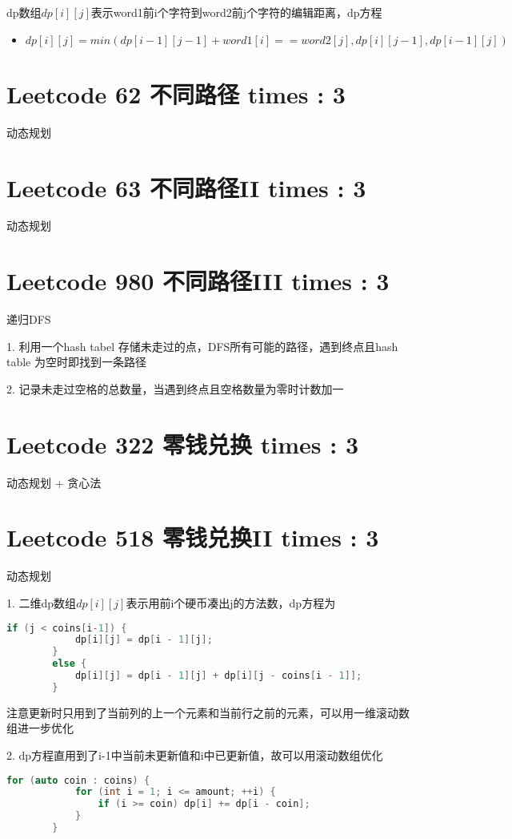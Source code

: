 \documentclass[UTF8]{ctexart}
\begin{document}
dp数组$dp[i][j]$表示word1前i个字符到word2前j个字符的编辑距离，dp方程
\begin{itemize}
	\item $dp[i][j] = min(dp[i - 1][j - 1] + word1[i] == word2[j], dp[i][j - 1], dp[i - 1][j])$
\end{itemize}

\section{Leetcode 62 不同路径 times : 3}
动态规划

\section{Leetcode 63 不同路径II times : 3}
动态规划

\section{Leetcode 980 不同路径III times : 3}
递归DFS

1. 利用一个hash tabel 存储未走过的点，DFS所有可能的路径，遇到终点且hash table 为空时即找到一条路径

2. 记录未走过空格的总数量，当遇到终点且空格数量为零时计数加一

\section{Leetcode 322 零钱兑换 times : 3}
动态规划 + 贪心法

\section{Leetcode 518 零钱兑换II times : 3}
动态规划

1. 二维dp数组$dp[i][j]$表示用前i个硬币凑出j的方法数，dp方程为
\begin{framed}
	\begin{lstlisting}[language=C++]
		if (j < coins[i-1]) {
			dp[i][j] = dp[i - 1][j];
		}
		else {
			dp[i][j] = dp[i - 1][j] + dp[i][j - coins[i - 1]];
		}
	\end{lstlisting}
\end{framed}
注意更新时只用到了当前列的上一个元素和当前行之前的元素，可以用一维滚动数组进一步优化

2. dp方程直用到了i-1中当前未更新值和i中已更新值，故可以用滚动数组优化
\begin{framed}
	\begin{lstlisting}[language=C++]
		for (auto coin : coins) {
			for (int i = 1; i <= amount; ++i) {
				if (i >= coin) dp[i] += dp[i - coin];
			}
		}
	\end{lstlisting}
\end{framed}
\end{document}
